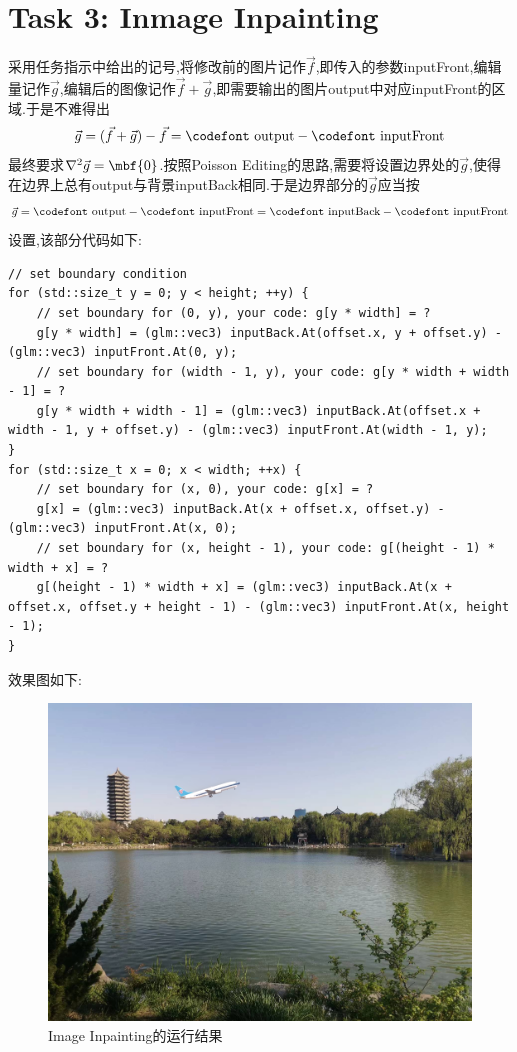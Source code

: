 \documentclass{ctexart}
\begin{document}
\section*{Task 3: Inmage Inpainting}
采用任务指示中给出的记号,将修改前的图片记作$\vec{f}$,即传入的参数{\codefont inputFront},编辑量记作$\vec{g}$,编辑后的图像记作$\vec{f}+\vec{g}$,即需要输出的图片{\codefont output}中对应{\codefont inputFront}的区域.于是不难得出
\[\vec{g}=(\vec{f}+\vec{g})-\vec{f}=\text{{\codefont output}}-\text{{\codefont inputFront}}\]最终要求$\nabla^2\vec{g}=\mbf{0}$.按照Poisson Editing的思路,需要将设置边界处的$\vec{g}$,使得在边界上总有{\codefont output}与背景{\codefont inputBack}相同.于是边界部分的$\vec{g}$应当按
\[\vec{g}=\text{{\codefont output}}-\text{{\codefont inputFront}}=\text{{\codefont inputBack}}-\text{{\codefont inputFront}}\]
设置,该部分代码如下:
\begin{lstlisting}
// set boundary condition
for (std::size_t y = 0; y < height; ++y) {
    // set boundary for (0, y), your code: g[y * width] = ?
    g[y * width] = (glm::vec3) inputBack.At(offset.x, y + offset.y) - (glm::vec3) inputFront.At(0, y);
    // set boundary for (width - 1, y), your code: g[y * width + width - 1] = ?
    g[y * width + width - 1] = (glm::vec3) inputBack.At(offset.x + width - 1, y + offset.y) - (glm::vec3) inputFront.At(width - 1, y);
}
for (std::size_t x = 0; x < width; ++x) {
    // set boundary for (x, 0), your code: g[x] = ?
    g[x] = (glm::vec3) inputBack.At(x + offset.x, offset.y) - (glm::vec3) inputFront.At(x, 0);
    // set boundary for (x, height - 1), your code: g[(height - 1) * width + x] = ?
    g[(height - 1) * width + x] = (glm::vec3) inputBack.At(x + offset.x, offset.y + height - 1) - (glm::vec3) inputFront.At(x, height - 1);
}
\end{lstlisting}
效果图如下:
\begin{figure}[H]
    \centering\includegraphics[scale=0.2]{figure/Inpainting.png}
    \caption{Image Inpainting的运行结果}
\end{figure}
\end{document}
